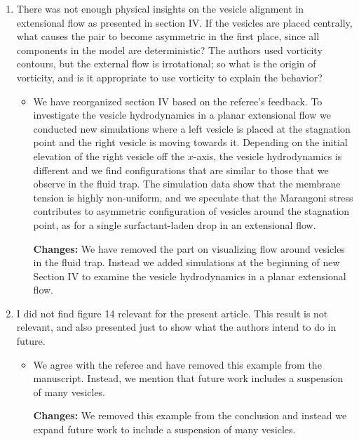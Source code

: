 \documentclass[11pt]{article}
\newcommand{\comment}[1]{{\color{blue} #1}}
\begin{document}
\begin{enumerate}
\noindent
\item\comment{There was not enough physical insights on the vesicle alignment
in extensional flow as presented in section IV. If the vesicles are
placed centrally, what causes the pair to become asymmetric in the first
place, since all components in the model are deterministic? The authors
used vorticity contours, but the external flow is irrotational; so what
is the origin of vorticity, and is it appropriate to use vorticity to
explain the behavior?}
\begin{itemize}
  \item We have reorganized section IV based on the referee's feedback. To investigate the vesicle hydrodynamics in a planar extensional flow we conducted new simulations where a left vesicle is placed at the stagnation point and the right vesicle is moving towards it. Depending on the initial elevation of the right vesicle off the $x$-axis, the vesicle hydrodynamics is different and we find configurations that are similar to those that we observe in the fluid trap. The simulation data show that the membrane tension is highly non-uniform, and we speculate that the Marangoni stress contributes to asymmetric configuration of vesicles around the stagnation point, as for a single surfactant-laden drop in an extensional flow.
  
  \noindent
  {\bf Changes:} We have removed the part on visualizing flow around vesicles in the fluid trap. Instead we added simulations at the beginning of new Section IV to examine the vesicle hydrodynamics in a planar extensional flow.
\end{itemize}

\noindent
\item\comment{I did not find figure 14 relevant for the present article. This
result is not relevant, and also presented just to show what the authors
intend to do in future.}
\begin{itemize}
  \item We agree with the referee and  have removed this example from the manuscript.  Instead, we
    mention that future work includes a suspension of many vesicles.
    
    \noindent
    {\bf Changes:} We removed this example from the conclusion and instead we expand future work to include a suspension of many vesicles.
\end{itemize}

\end{enumerate}
\end{document}
